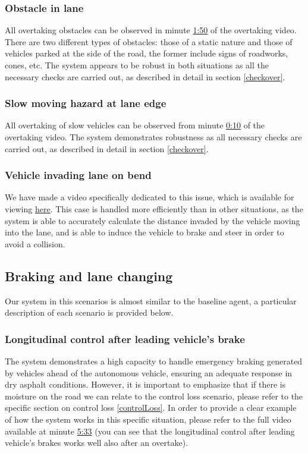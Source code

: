 \documentclass{article}
\begin{document}
\subsubsection{Obstacle in lane}
All overtaking obstacles can be observed in minute \href{https://youtu.be/vDg-9poUQ9k?t=110}{1:50} of the overtaking video. There are two different types of obstacles: those of a static nature and
those of vehicles parked at the side of the road, the former include signs of roadworks, cones, etc. The system appears to be robust in both situations
as all the necessary checks are carried out, as described in detail in section \ref{checkover}.
\subsubsection{Slow moving hazard at lane edge}
All overtaking of slow vehicles can be observed from minute \href{https://youtu.be/vDg-9poUQ9k?t=10}{0:10} of the overtaking video. The system demonstrates robustness as all necessary checks are
carried out, as described in detail in section \ref{checkover}.
\subsubsection{Vehicle invading lane on bend}
We have made a video specifically dedicated to this issue, which is available for viewing \href{https://youtu.be/KME91FAB5ko}{here}. This case is handled more efficiently than in other situations,
as the system is able to accurately calculate the distance invaded by the vehicle moving into the lane, and is able to induce the vehicle to brake and steer in
order to avoid a collision.

\subsection{Braking and lane changing}
Our system in this scenarios is almost similar to the baseline agent, a particular description of each scenario is provided below.
\subsubsection{Longitudinal control after leading vehicle’s brake}
The system demonstrates a high capacity to handle emergency braking generated by vehicles ahead of the autonomous vehicle, ensuring an adequate response in
dry asphalt conditions. However, it is important to emphasize that if there is moisture on the road we can relate to the control loss scenario, please refer to the specific section on control loss \ref{controlLoss}.
In order to provide a clear example of how the system works in this specific situation, please refer to the full video available at minute \href{https://youtu.be/RBGWd_so80U?t=333}{5:33} (you can see that the longitudinal control after leading vehicle's brakes works well also after an overtake).
\end{document}
